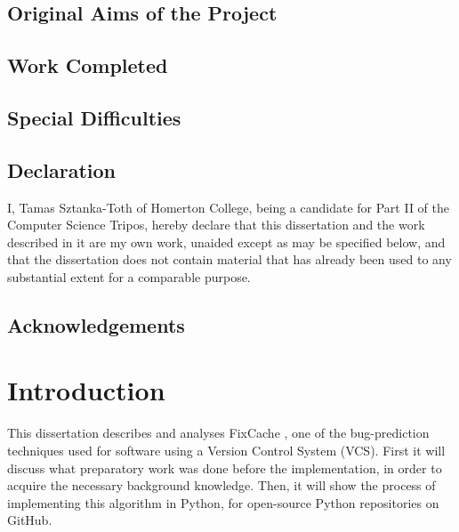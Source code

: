 \documentclass[12pt,twoside,notitlepage]{report}
\newcommand{\fxch}{FixCache}
\begin{document}
\section*{Original Aims of the Project}


\section*{Work Completed}

\section*{Special Difficulties}
 
\newpage
\section*{Declaration}

I, Tamas Sztanka-Toth of Homerton College, being a candidate for Part II of the Computer
Science Tripos, hereby declare
that this dissertation and the work described in it are my own work,
unaided except as may be specified below, and that the dissertation
does not contain material that has already been used to any substantial
extent for a comparable purpose.

\bigskip
{}

\medskip
{}

\cleardoublepage

\tableofcontents

\listoffigures

\newpage
\section*{Acknowledgements}



\cleardoublepage        %
\setcounter{page}{1}
\pagestyle{headings}
\chapter{Introduction}
This dissertation describes and analyses \fxch{} \cite{FixCache}, one of the bug-prediction techniques used for software using a Version Control System (VCS). First it will discuss what preparatory work was done before the implementation, in order to acquire the necessary background knowledge. Then, it will show the process of implementing this algorithm in Python, for open-source Python repositories on GitHub.
\end{document}
